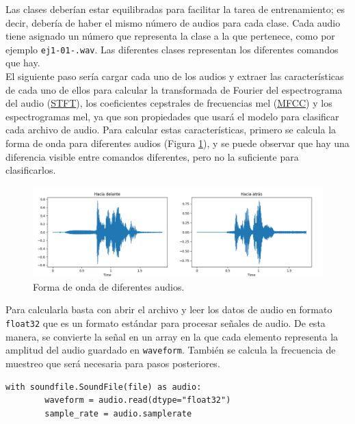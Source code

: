 Las clases deberían estar equilibradas para facilitar la tarea de entrenamiento; es decir, debería de haber el mismo número de audios para cada clase. Cada audio tiene asignado un número que representa la clase a la que pertenece, como por ejemplo \texttt{ej1-01-.wav}. Las diferentes clases representan los diferentes comandos que hay.\\


 El siguiente paso sería cargar cada uno de los audios y extraer las características de cada uno de ellos para calcular la transformada de Fourier del espectrograma del audio (\hyperlink{STFT}{STFT}), los coeficientes cepstrales de frecuencias mel (\hyperlink{MFCC}{MFCC}) y los espectrogramas mel, ya que son propiedades que usará el modelo para clasificar cada archivo de audio. Para calcular estas características, primero se calcula la forma de onda para diferentes audios (Figura \ref{fig:onda}), y se puede observar que hay una diferencia visible entre comandos diferentes, pero no la suficiente para clasificarlos.
 
 \begin{figure}[H]
  \centering
  \includegraphics[scale=0.3]{figs/forma_onda} %
  \caption{ Forma de onda de diferentes audios.}
  \label{fig:onda}
\end{figure}



Para calcularla basta con abrir el archivo y leer los datos de audio en formato \texttt{float32} que es un formato estándar para procesar señales de audio. De esta manera, se convierte la señal en un array en la que cada elemento representa la amplitud del audio guardado en \texttt{waveform}. También se calcula la frecuencia de muestreo que será necesaria para pasos posteriores.

\begin{verbatim}
with soundfile.SoundFile(file) as audio:
        waveform = audio.read(dtype="float32")
        sample_rate = audio.samplerate
\end{verbatim}

